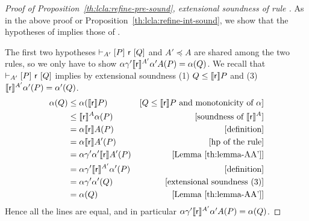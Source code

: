 \begin{proof}[Proof of Proposition~\ref{th:lcla:refine-pre-sound}, extensional soundness of rule ]
	As in the above proof or Proposition~\ref{th:lcla:refine-int-sound}, we show that the hypotheses of  implies those of .
	
	The first two hypotheses $\vdash_{A'}\nobreak[P]~\mathsf{r}~[Q]$ and $A' \preceq A$ are shared among the two rules, so we only have to show $\alpha \gamma' \llbracket\mathsf{r}\rrbracket^{A'} \alpha' A(P) = \alpha(Q)$. We recall that $\vdash_{A'}\nobreak[P]~\mathsf{r}~[Q]$ implies by extensional soundness (1) $Q \le \llbracket\mathsf{r}\rrbracket P$ and (3) $\llbracket\mathsf{r}\rrbracket^{A'} \alpha'(P) = \alpha'(Q)$.
	\begin{align*}
		\alpha(Q) &\le \alpha(\llbracket\mathsf{r}\rrbracket P ) &[Q \le \llbracket\mathsf{r}\rrbracket P \text{ and monotonicity of }\alpha] \\
		&\le \llbracket\mathsf{r}\rrbracket^{A} \alpha(P) &[\text{soundness of }\llbracket\mathsf{r}\rrbracket^{A}] \\
		&= \alpha \llbracket\mathsf{r}\rrbracket A(P) &[\text{definition}] \\
		&= \alpha \llbracket\mathsf{r}\rrbracket A'(P) &[\text{hp of the rule}] \\
		&= \alpha \gamma' \alpha' \llbracket\mathsf{r}\rrbracket A'(P) &[\text{Lemma~\ref{th:lemma-AA'}}] \\
		&= \alpha \gamma' \llbracket\mathsf{r}\rrbracket^{A'} \alpha'(P) &[\text{definition}] \\
		&= \alpha \gamma' \alpha'(Q) &[\text{extensional soundness (3)}] \\
		&= \alpha(Q) &[\text{Lemma~\ref{th:lemma-AA'}}]
	\end{align*}
	Hence all the lines are equal, and in particular $\alpha \gamma' \llbracket\mathsf{r}\rrbracket^{A'} \alpha' A(P) = \alpha(Q)$.
\end{proof}

